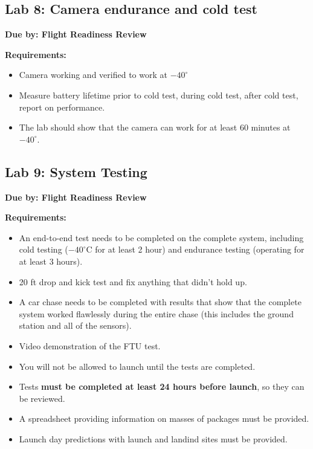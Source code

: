 \documentclass[11pt]{article}
\begin{document}
\subsection{Lab 8:  Camera endurance and cold test}

{\bf Due by: Flight Readiness Review}

\noindent
{\bf Requirements:}

\begin{itemize}
    \item Camera working and verified to work at $-40^\circ$
    \item Measure battery lifetime prior to cold test, during cold
      test, after cold test, report on performance.
    \item The lab should show that the camera can work for at least 60
      minutes at $-40^\circ$.
\end{itemize}

\subsection{Lab 9:  System Testing}

{\bf Due by: Flight Readiness Review}

\noindent
{\bf Requirements:}

\begin{itemize}
    \item An end-to-end test needs to be completed on the complete
      system, including cold testing ($-40^\circ$C for at least 2
      hour) and endurance testing (operating for at least 3 hours).
    \item 20 ft drop and kick test and fix anything that didn’t hold
      up.
    \item A car chase needs to be completed with results that show
      that the complete system worked flawlessly during the entire
      chase (this includes the ground station and all of the sensors).
    \item Video demonstration of the FTU test.
    \item You will not be allowed to launch until the tests are completed.
    \item Tests {\bf must be completed at least 24 hours before
      launch}, so they can be reviewed.
    \item A spreadsheet providing information on masses of packages
      must be provided.
    \item Launch day predictions with launch and landind sites must be
      provided.
\end{itemize}
\end{document}
